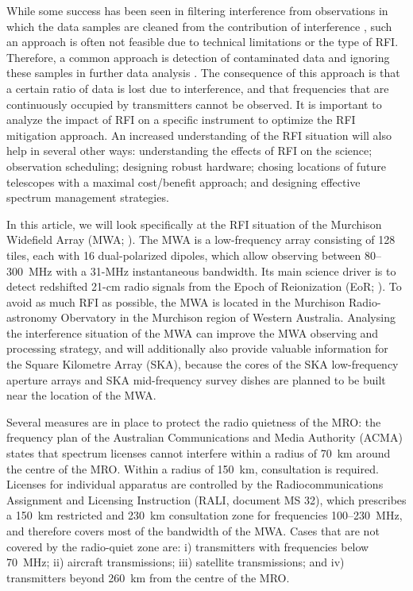 \documentclass{pasa}
\begin{document}
While some success has been seen in filtering interference from observations in which the data samples are cleaned from the contribution of interference \citep{spatial-filtering-parkes-multibeam-for-pulses,rfi-spatial-processing-hellbourg-2014}, such an approach is often not feasible due to technical limitations or the type of RFI. Therefore, a common approach is detection of contaminated data and ignoring these samples in further data analysis \citep{statistical-rfi-removal,pieflag-middelberg,post-correlation-rfi-classification,prasad-flagcal-2012,serpent-peck-2013}. The consequence of this approach is that a certain ratio of data is lost due to interference, and that frequencies that are continuously occupied by transmitters cannot be observed. It is important to analyze the impact of RFI on a specific instrument to optimize the RFI mitigation approach. An increased understanding of the RFI situation will also help in several other ways: understanding the effects of RFI on the science; observation scheduling; designing robust hardware; chosing locations of future telescopes with a maximal cost/benefit approach; and designing effective spectrum management strategies.

In this article, we will look specifically at the RFI situation of the Murchison Widefield Array (MWA; \citealt{mwa}). The MWA is a low-frequency array consisting of 128 tiles, each with 16 dual-polarized dipoles, which allow observing between 80--300~MHz with a 31-MHz instantaneous bandwidth. Its main science driver is to detect redshifted 21-cm radio signals from the Epoch of Reionization (EoR; \citealt{bowman-science-with-the-mwa-2013}). To avoid as much RFI as possible, the MWA is located in the Murchison Radio-astronomy Obervatory in the Murchison region of Western Australia. Analysing the interference situation of the MWA can improve the MWA observing and processing strategy, and will additionally also provide valuable information for the Square Kilometre Array (SKA), because the cores of the SKA low-frequency aperture arrays and SKA mid-frequency survey dishes are planned to be built near the location of the MWA.

Several measures are in place to protect the radio quietness of the MRO: the frequency plan of the Australian Communications and Media Authority (ACMA) states that spectrum licenses cannot interfere within a radius of 70~km around the centre of the MRO. Within a radius of 150~km, consultation is required. Licenses for individual apparatus are controlled by the Radiocommunications Assignment and Licensing Instruction (RALI, document MS 32), which prescribes a 150~km restricted and 230~km consultation zone for frequencies 100--230~MHz, and therefore covers most of the bandwidth of the MWA. Cases that are not covered by the radio-quiet zone are: i) transmitters with frequencies below 70~MHz; ii) aircraft transmissions; iii) satellite transmissions; and iv) transmitters beyond 260~km from the centre of the MRO.
\end{document}
